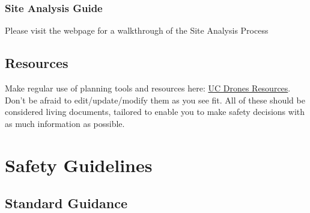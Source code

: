 \documentclass[
]{book}
\begin{document}
\hypertarget{site-analysis-guide}{%
\subsection{Site Analysis Guide}\label{site-analysis-guide}}

Please visit the webpage for a walkthrough of the Site Analysis Process

\hypertarget{resources}{%
\section{Resources}\label{resources}}

Make regular use of planning tools and resources here: \href{https://ucdrones.github.io/ch-resources.html}{UC Drones Resources}. Don't be afraid to edit/update/modify them as you see fit. All of these should be considered living documents, tailored to enable you to make safety decisions with as much information as possible.

\hypertarget{ch-safety-guidelines}{%
\chapter{Safety Guidelines}\label{ch-safety-guidelines}}

\hypertarget{standard-guidance}{%
\section{Standard Guidance}\label{standard-guidance}}
\end{document}
